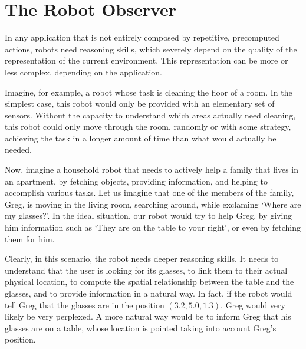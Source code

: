 \part{The Robot Observer} %

\label{part:robot_observer} %



In any application that is not entirely composed by repetitive, precomputed actions, robots need reasoning skills, which severely depend on the quality of the representation of the current environment. This representation can be more or less complex, depending on the application. 

Imagine, for example, a robot whose task is cleaning the floor of a room. In the simplest case, this robot would only be provided with an elementary set of sensors. Without the capacity to understand which areas actually need cleaning, this robot could only move through the room, randomly or with some strategy, achieving the task in a longer amount of time than what would actually be needed. 


Now, imagine a household robot that needs to actively help a family that lives in an apartment, by fetching objects, providing information, and helping to accomplish various tasks. Let us imagine that one of the members of the family, Greg, is moving in the living room, searching around, while exclaming `Where are my glasses?'. In the ideal situation, our robot would try to help Greg, by giving him information such as `They are on the table to your right', or even by fetching them for him. 

Clearly, in this scenario, the robot needs deeper reasoning skills. It needs to understand that the user is looking for its glasses, to link them to their actual physical location, to compute the spatial relationship between the table and the glasses, and to provide information in a natural way. In fact, if the robot would tell Greg that the glasses are in the position $(3.2, 5.0 , 1.3)$, Greg would very likely be very perplexed. A more natural way would be to inform Greg that his glasses are on a table, whose location is pointed taking into account Greg's position.

